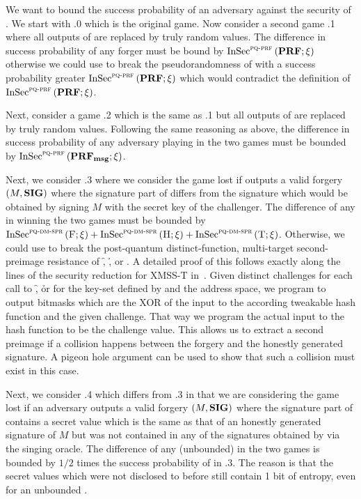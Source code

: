 We want to bound the success probability of an adversary \A against the 
\pqeucma security of \spx.
We start with \game.0 which is the original \pqeucma game. Now consider a second 
game \game.1 where all outputs of \sphincsPRF are replaced by truly random 
values. The difference in success probability of any forger \A must be bound by 
${\mathrm{InSec}}^{{\mathsf{\textsc{pq-prf}}}}\left( {\mathbf{PRF}}; {\xi} \right) $ otherwise we could use \A to break the 
pseudorandomness of \sphincsPRF with a success probability greater 
${\mathrm{InSec}}^{{\mathsf{\textsc{pq-prf}}}}\left( {\mathbf{PRF}}; {\xi} \right) $ which would contradict the definition of 
${\mathrm{InSec}}^{{\mathsf{\textsc{pq-prf}}}}\left( {\mathbf{PRF}}; {\xi} \right) $. 

Next, consider a game \game.2 which is 
the same as \game.1 but all outputs of \sphincsPRFmsg are replaced by truly 
random values. Following the same reasoning as above, the difference in 
success probability of any adversary \A playing in the two games must be bounded 
by ${\mathrm{InSec}}^{{\mathsf{\textsc{pq-prf}}}}\left( {\mathbf{PRF_{msg}}}; {\xi} \right) $.

Next, we consider \game.3 where we consider the game lost if \A outputs a valid 
forgery $(M,\mathbf{SIG})$ where the \fors signature part of \spxsig differs from the 
signature which would be obtained by signing $M$ with the secret key of the 
challenger. The difference of any \A in winning the two games must be bounded 
by ${\mathrm{InSec}}^{{\mathsf{\textsc{pq-dm-spr}}}}\left( {\textsc{F}}; {\xi} \right) + {\mathrm{InSec}}^{{\mathsf{\textsc{pq-dm-spr}}}}\left( {\textsc{H}}; {\xi} \right) + {\mathrm{InSec}}^{{\mathsf{\textsc{pq-dm-spr}}}}\left( {\textsc{T}}; {\xi} \right) $.
Otherwise, we could use \A to break the post-quantum distinct-function, 
multi-target second-preimage resistance of \f, \h, or \tfunc. A detailed proof
of this follows exactly along the lines of the security reduction for XMSS-T 
in~\cite{Huelsing2016}. Given distinct challenges for each call to \f, \h or 
\tfunc for the key-set defined by \pseed and the address space, we program 
\prfbm to output bitmasks which are the XOR of the input to the according 
tweakable hash function and the given challenge. That way we program the actual 
input to the hash function to be the challenge value. This allows us to extract
a second preimage if a collision happens between the forgery and the honestly 
generated signature. A pigeon hole argument can be used to show that such a 
collision must exist in this case.

Next, we consider \game.4 which differs from \game.3 in that we are considering 
the game lost if an adversary outputs a valid 
forgery $(M,\mathbf{SIG})$ where the \fors signature part of \spxsig contains a 
secret value which is the same as that of an honestly generated signature of $M$
but was not contained in any of the signatures obtained by \A via the singing 
oracle. The difference of any (unbounded) \A in the two games is bounded by 
$1/2$ times the success probability of \A in \game.3. The reason is that 
the secret values which were not disclosed to \A before still contain 1 bit of 
entropy, even for an unbounded \A.

